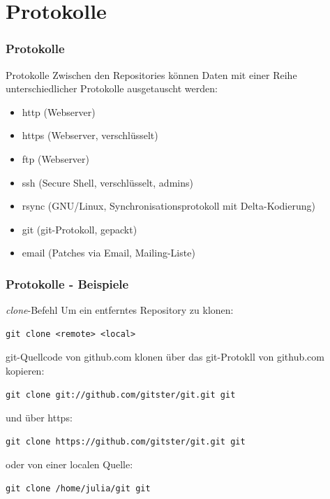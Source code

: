 \documentclass{beamer}
\begin{document}
\section{Protokolle}

\begin{frame}[fragile]\frametitle{Protokolle}
\begin{block} {Protokolle}
Zwischen den Repositories können Daten mit einer Reihe unterschiedlicher Protokolle ausgetauscht werden:
\begin{itemize}
\item http (Webserver)
\item https (Webserver, verschlüsselt)
\item ftp (Webserver)
\item ssh (Secure Shell, verschlüsselt, admins)
\item rsync (GNU/Linux, Synchronisationsprotokoll mit Delta-Kodierung)
\item git (git-Protokoll, gepackt)
\item email (Patches via Email, Mailing-Liste)
\end{itemize}
\end{block}
\end{frame}

\begin{frame}[fragile]\frametitle{Protokolle - Beispiele}
\begin{block} {\textit{clone}-Befehl}
Um ein entferntes Repository zu klonen:
\begin{lstlisting}
git clone <remote> <local>
\end{lstlisting}
\end{block}
\begin{exampleblock} {git-Quellcode von github.com klonen}
über das git-Protokll von github.com kopieren:
\begin{lstlisting}
git clone git://github.com/gitster/git.git git
\end{lstlisting}
und über https:
\begin{lstlisting}
git clone https://github.com/gitster/git.git git
\end{lstlisting}
oder von einer localen Quelle:
\begin{lstlisting}
git clone /home/julia/git git
\end{lstlisting}
\end{exampleblock}
\end{frame}
\end{document}
